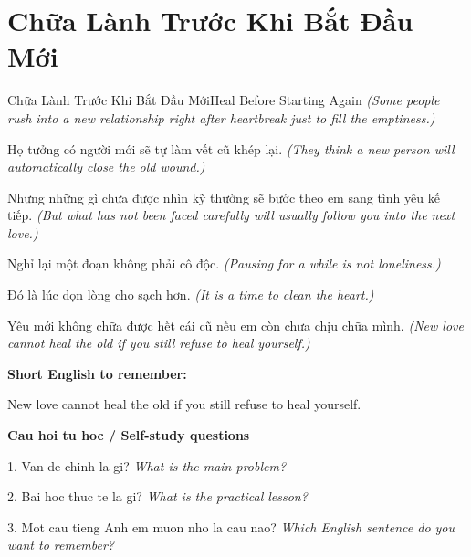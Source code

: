 \section{Chữa Lành Trước Khi Bắt Đầu Mới}
\begin{truyen}{Chữa Lành Trước Khi Bắt Đầu Mới}{Heal Before Starting Again}
\textit{(Some people rush into a new relationship right after heartbreak just to fill the emptiness.)}

Họ tưởng có người mới sẽ tự làm vết cũ khép lại.
\textit{(They think a new person will automatically close the old wound.)}

Nhưng những gì chưa được nhìn kỹ thường sẽ bước theo em sang tình yêu kế tiếp.
\textit{(But what has not been faced carefully will usually follow you into the next love.)}

Nghỉ lại một đoạn không phải cô độc.
\textit{(Pausing for a while is not loneliness.)}

Đó là lúc dọn lòng cho sạch hơn.
\textit{(It is a time to clean the heart.)}

\end{truyen}

\begin{baihoc}
Yêu mới không chữa được hết cái cũ nếu em còn chưa chịu chữa mình.
\textit{(New love cannot heal the old if you still refuse to heal yourself.)}
\end{baihoc}

\begin{ghinhoanh}
\textbf{Short English to remember:}

New love cannot heal the old if you still refuse to heal yourself.

\end{ghinhoanh}

\begin{tuhocnhanh}
\textbf{Cau hoi tu hoc / Self-study questions}

1. Van de chinh la gi? \textit{What is the main problem?}

2. Bai hoc thuc te la gi? \textit{What is the practical lesson?}

3. Mot cau tieng Anh em muon nho la cau nao? \textit{Which English sentence do you want to remember?}
\end{tuhocnhanh}
